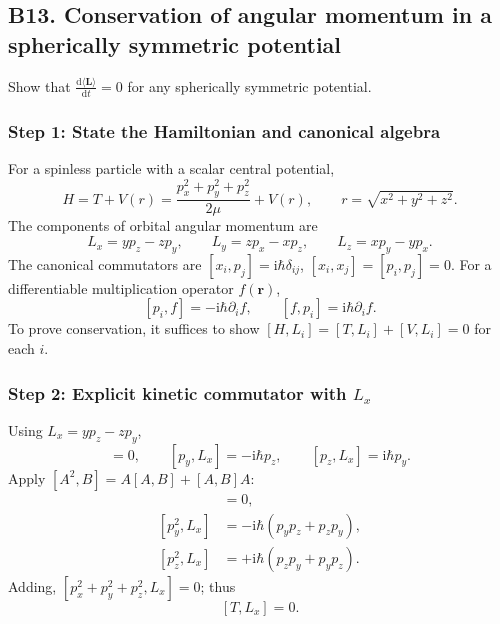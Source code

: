 \documentclass[11pt,a4paper]{article}
\newcommand{\dd}{\mathrm{d}}
\newcommand{\iu}{\mathrm{i}}
\newcommand{\p}{\partial}
\begin{document}
\subsection{B13. Conservation of angular momentum in a spherically symmetric potential}
\begin{questionbox}Show that \(\displaystyle\frac{\dd\langle\mathbf L\rangle}{\dd t}=0\) for any spherically symmetric potential.\end{questionbox}
\subsubsection*{Step 1: State the Hamiltonian and canonical algebra}
For a spinless particle with a scalar central potential,
\begin{equation}\boxed{H=T+V(r)=\frac{p_x^2+p_y^2+p_z^2}{2\mu}+V(r),\qquad r=\sqrt{x^2+y^2+z^2}.}\end{equation}
The components of orbital angular momentum are
\begin{equation}L_x=yp_z-zp_y,\qquad L_y=zp_x-xp_z,\qquad L_z=xp_y-yp_x.\end{equation}
The canonical commutators are \([x_i,p_j]=\iu\hbar\delta_{ij}\), \([x_i,x_j]=[p_i,p_j]=0\). For a differentiable multiplication operator \(f(\mathbf r)\),
\begin{equation}\boxed{[p_i,f]=-\iu\hbar\p_i f,\qquad[f,p_i]=\iu\hbar\p_i f.}\end{equation}
To prove conservation, it suffices to show \([H,L_i]=[T,L_i]+[V,L_i]=0\) for each \(i\).

\subsubsection*{Step 2: Explicit kinetic commutator with \texorpdfstring{$L_x$}{Lx}}
Using \(L_x=yp_z-zp_y\),
\begin{equation}[p_x,L_x]=0,\qquad[p_y,L_x]=-\iu\hbar p_z,\qquad[p_z,L_x]=\iu\hbar p_y.\end{equation}
Apply \([A^2,B]=A[A,B]+[A,B]A\):
\begin{align}
[p_x^2,L_x]&=0,\\
[p_y^2,L_x]&=-\iu\hbar(p_yp_z+p_zp_y),\\
[p_z^2,L_x]&=+\iu\hbar(p_zp_y+p_yp_z).
\end{align}
Adding, \([p_x^2+p_y^2+p_z^2,L_x]=0\); thus
\begin{equation}\boxed{[T,L_x]=0.}\end{equation}
\end{document}
